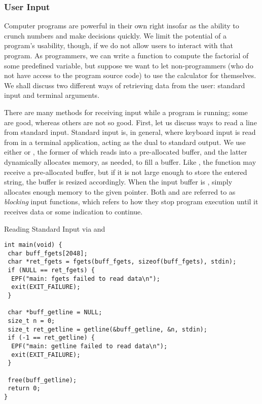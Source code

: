 \subsubsection*{User Input}

Computer programs are powerful in their own right insofar as the ability to crunch numbers and make decisions quickly. We limit the potential of a program's usability, though, if we do not allow users to interact with that program. As programmers, we can write a function to compute the factorial of some predefined variable, but suppose we want to let non-programmers (who do not have access to the program source code) to use the calculator for themselves. We shall discuss two different ways of retrieving data from the user: standard input and terminal arguments.


There are many methods for receiving input while a program is running; some are good, whereas others are not so good. First, let us discuss ways to read a line from standard input. Standard input is, in general, where keyboard input is read from in a terminal application, acting as the 
dual to standard output. We use either  or , the former of which reads into a pre-allocated  buffer, and the latter dynamically allocates memory, as needed, to fill a buffer. Like , the  function may receive a pre-allocated buffer, but if it is not large enough to store the entered string, the buffer is resized accordingly. When the input buffer is ,  simply allocates enough memory to the given pointer. Both  and  are referred to as \textit{blocking} input functions, which refers to how they stop program execution until it receives data or some indication to continue.

\begin{cl}[main.c]{Reading Standard Input via  and }
\begin{lstlisting}[language=MyC]
int main(void) {
 char buff_fgets[2048];
 char *ret_fgets = fgets(buff_fgets, sizeof(buff_fgets), stdin);
 if (NULL == ret_fgets) {
  EPF("main: fgets failed to read data\n");
  exit(EXIT_FAILURE);
 }

 char *buff_getline = NULL;
 size_t n = 0;
 size_t ret_getline = getline(&buff_getline, &n, stdin);
 if (-1 == ret_getline) {
  EPF("main: getline failed to read data\n");
  exit(EXIT_FAILURE);
 }

 free(buff_getline);
 return 0;
}
\end{lstlisting}
\end{cl}

